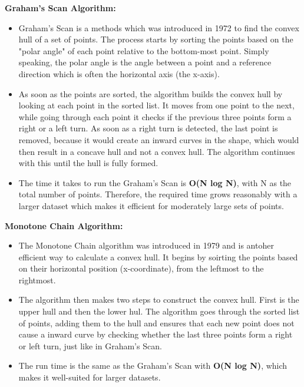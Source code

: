     \textbf{Graham's Scan Algorithm:} 
    \begin{itemize}
        \item Graham's Scan is a methods which was introduced in 1972 to find the convex hull of a set of points. The process starts by sorting the points based on the "polar angle" of each point relative to the bottom-most point. Simply speaking, the polar angle is the angle between a point and a reference direction which is often the horizontal axis (the x-axis).
        \item As soon as the points are sorted, the algorithm builds the convex hull by looking at each point in the sorted list. It moves from one point to the next, while going through each point it checks if the previous three points form a right or a left turn. As soon as a right turn is detected, the last point is removed, because it would create an inward curves in the shape, which would then result in a concave hull and not a convex hull. The algorithm continues with this until the hull is fully formed.
        \item The time it takes to run the Graham's Scan is \textbf{O(N log N)}, with N as the total number of points. Therefore, the required time grows reasonably with a larger dataset which makes it efficient for moderately large sets of points.
    \end{itemize} 
    \autocite{Andi:typesOfConvexHullAlgos, Andi:convexHullPic} \newline \newline
    \textbf{Monotone Chain Algorithm:}
    \begin{itemize}
        \item The Monotone Chain algorithm was introduced in 1979 and is antoher efficient way to calculate a convex hull. It begins by soirting the points based on their horizontal position (x-coordinate), from the leftmost to the rightmost.
        \item The algorithm then makes two steps to construct the convex hull. First is the upper hull and then the lower hul. The algorithm goes through the sorted list of points, adding them to the hull and ensures that each new point does not cause a inward curve by checking whether the last three points form a right or left turn, just like in Graham's Scan.
        \item The run time is the same as the Graham's Scan with \textbf{O(N log N)}, which makes it well-suited for larger datasets.
    \end{itemize} \autocite{Andi:typesOfConvexHullAlgos, Andi:convexHullPic}

